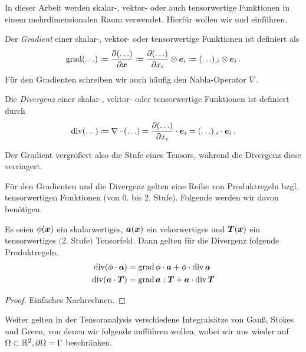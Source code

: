 In dieser Arbeit werden skalar-, vektor- oder auch tensorwertige Funktionen in einem mehrdimensionalen Raum verwendet. Hierfür wollen wir  und  einführen.

\begin{defi}\label{def:C.10}
Der \textit{Gradient} einer  skalar-, vektor- oder  tensorwertige Funktionen ist definiert als
\[
	\operatorname{grad}(\ldots) \coloneqq \frac{\partial(\ldots)}{\partial\boldsymbol x} \coloneqq \frac{\partial(\ldots)}{\partial x_i}\otimes \boldsymbol e_i \coloneqq (\ldots)_{,i} \otimes \boldsymbol e_i \, . 
\]
Für den Gradienten schreiben wir auch häufig den Nabla-Operator $\nabla$.

Die \textit{Divergenz} einer skalar-, vektor- oder  tensorwertige Funktionen ist definiert durch
\[
	\operatorname{div} (\ldots) \coloneqq \nabla \cdot (\ldots) = \frac{\partial(\ldots)}{\partial x_i}\cdot \boldsymbol e_i = (\ldots)_{,i} \cdot \boldsymbol e_i \, .
\]
\end{defi}

\begin{bem*}
Der Gradient vergrößert also die Stufe eines Tensors, während die Divergenz diese verringert.
\end{bem*}

Für den Gradienten und die Divergenz gelten eine Reihe von Produktregeln bzgl. tensorwertigen Funktionen (von 0. bis 2. Stufe). Folgende werden wir davon benötigen.

\begin{satz}\label{satz:C.11}
Es seien $\phi(\boldsymbol x)$ ein skalarwertiges, $\boldsymbol a(\boldsymbol x)$ ein vekorwertiges und $\boldsymbol T(\boldsymbol x)$ ein tensorwertiges $($2. Stufe$)$ Tensorfeld. Dann gelten für die Divergenz folgende Produktregeln.
\begin{align}\label{eq:C.1}
	\operatorname{div} (\phi \cdot \boldsymbol a ) &= \operatorname{grad} \phi \cdot \boldsymbol a + \phi \cdot \operatorname{div} \boldsymbol a \\
	\label{eq:C.2}
	\operatorname{div} (\boldsymbol a \cdot \boldsymbol T) &= \operatorname{grad} \boldsymbol a : \boldsymbol T + \boldsymbol a \cdot \operatorname{div} \boldsymbol T 
\end{align}
\end{satz}

\begin{proof}
Einfaches Nachrechnen.
\end{proof}


Weiter gelten in der Tensoranalysis verschiedene Integralsätze von Gauß, Stokes und Green, von denen wir folgende aufführen wollen, wobei wir uns wieder auf $\Omega \subset \mathbb{R}^2, \partial\Omega = \Gamma$ beschränken.


